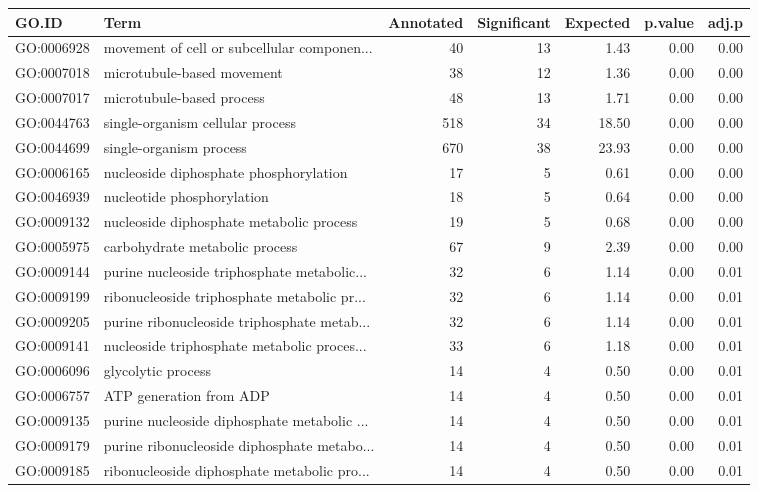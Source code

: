 \begin{table}[ht]
\centering
\begin{tabular}{llrrrrr}
  \hline
GO.ID & Term & Annotated & Significant & Expected & p.value & adj.p \\ 
  \hline
GO:0006928 & movement of cell or subcellular componen... &  40 &  13 & 1.43 & 0.00 & 0.00 \\ 
  GO:0007018 & microtubule-based movement &  38 &  12 & 1.36 & 0.00 & 0.00 \\ 
  GO:0007017 & microtubule-based process &  48 &  13 & 1.71 & 0.00 & 0.00 \\ 
  GO:0044763 & single-organism cellular process & 518 &  34 & 18.50 & 0.00 & 0.00 \\ 
  GO:0044699 & single-organism process & 670 &  38 & 23.93 & 0.00 & 0.00 \\ 
  GO:0006165 & nucleoside diphosphate phosphorylation &  17 &   5 & 0.61 & 0.00 & 0.00 \\ 
  GO:0046939 & nucleotide phosphorylation &  18 &   5 & 0.64 & 0.00 & 0.00 \\ 
  GO:0009132 & nucleoside diphosphate metabolic process &  19 &   5 & 0.68 & 0.00 & 0.00 \\ 
  GO:0005975 & carbohydrate metabolic process &  67 &   9 & 2.39 & 0.00 & 0.00 \\ 
  GO:0009144 & purine nucleoside triphosphate metabolic... &  32 &   6 & 1.14 & 0.00 & 0.01 \\ 
  GO:0009199 & ribonucleoside triphosphate metabolic pr... &  32 &   6 & 1.14 & 0.00 & 0.01 \\ 
  GO:0009205 & purine ribonucleoside triphosphate metab... &  32 &   6 & 1.14 & 0.00 & 0.01 \\ 
  GO:0009141 & nucleoside triphosphate metabolic proces... &  33 &   6 & 1.18 & 0.00 & 0.01 \\ 
  GO:0006096 & glycolytic process &  14 &   4 & 0.50 & 0.00 & 0.01 \\ 
  GO:0006757 & ATP generation from ADP &  14 &   4 & 0.50 & 0.00 & 0.01 \\ 
  GO:0009135 & purine nucleoside diphosphate metabolic ... &  14 &   4 & 0.50 & 0.00 & 0.01 \\ 
  GO:0009179 & purine ribonucleoside diphosphate metabo... &  14 &   4 & 0.50 & 0.00 & 0.01 \\ 
  GO:0009185 & ribonucleoside diphosphate metabolic pro... &  14 &   4 & 0.50 & 0.00 & 0.01 \\ 

\end{tabular}
\end{table}
